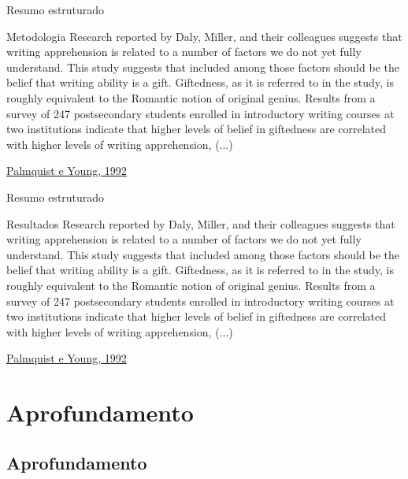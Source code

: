 \documentclass{beamer}
\begin{document}
\begin{frame}{Resumo estruturado}
  \begin{exampleblock}{Metodologia}
    \scriptsize
    Research reported by Daly, Miller, and their colleagues suggests
    that writing apprehension is related to a number of factors we do
    not yet fully understand. This study suggests that included among
    those factors should be the belief that writing ability is a
    gift. Giftedness, as it is referred to in the study, is roughly
    equivalent to the Romantic notion of original genius. Results from
    \alert{a survey of 247 postsecondary students enrolled in
      introductory writing courses at two institutions} indicate that
    higher levels of belief in giftedness are correlated with higher
    levels of writing apprehension, (...)
  \end{exampleblock}

  \vfill
  \scriptsize
  \hfill \href{https://doi.org/10.1177/0741088392009001004}{Palmquist e Young, 1992}
\end{frame}

\begin{frame}{Resumo estruturado}
  \begin{exampleblock}{Resultados}
    \scriptsize
    Research reported by Daly, Miller, and their colleagues suggests
    that writing apprehension is related to a number of factors we do
    not yet fully understand. This study suggests that included among
    those factors should be the belief that writing ability is a
    gift. Giftedness, as it is referred to in the study, is roughly
    equivalent to the Romantic notion of original
    genius. \alert{Results} from a survey of 247 postsecondary
    students enrolled in introductory writing courses at two
    institutions \alert{indicate that higher levels of belief in
      giftedness are correlated with higher levels of writing
      apprehension,} (...)
  \end{exampleblock}

  \vfill
  \scriptsize
  \hfill \href{https://doi.org/10.1177/0741088392009001004}{Palmquist e Young, 1992}
\end{frame}

\section{Aprofundamento}

\subsection{Aprofundamento}
\end{document}
